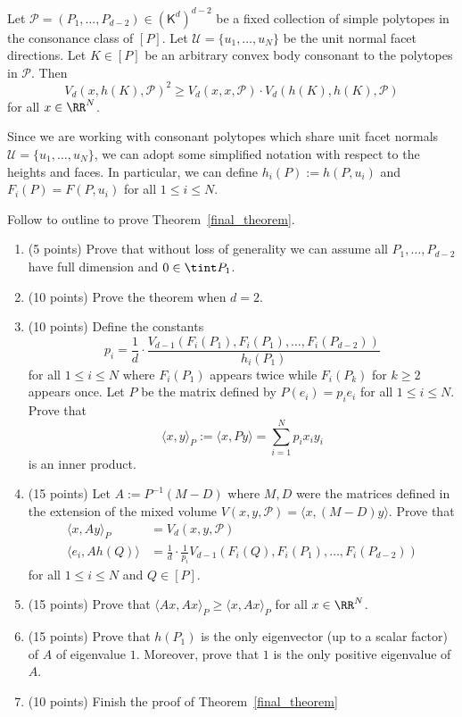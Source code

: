 \documentclass[11pt]{article}
\begin{document}
\begin{thm}\label{final_theorem}
    Let $\mathcal{P} = (P_1, \ldots, P_{d-2}) \in (\mathsf{K}^d)^{d-2}$ be a fixed collection of simple polytopes in the consonance class of $[P]$. Let $\mathcal{U} = \{u_1, \ldots, u_N\}$ be the unit normal facet directions. Let $K \in [P]$ be an arbitrary convex body consonant to the polytopes in $\mathcal{P}$. Then 
    \[
        V_{d}(x, h(K), \mathcal{P})^2 \geq V_{d}(x, x, \mathcal{P}) \cdot V_{d}(h(K), h(K), \mathcal{P})    
    \]
    for all $x \in \RR^N$. 
\end{thm}

Since we are working with consonant polytopes which share unit facet normals $\mathcal{U} = \{u_1, \ldots, u_N\}$, we can adopt some simplified notation with respect to the heights and faces. In particular, we can define $h_i(P) := h(P, u_i)$ and $F_i(P) = F(P, u_i)$ for all $1 \leq i \leq N$.

\begin{prob} [80 points]
    Follow to outline to prove Theorem~\ref{final_theorem}.
    \begin{enumerate}[label = (\alph*)]
        \item (5 points) Prove that without loss of generality we can assume all $P_1, \ldots, P_{d-2}$ have full dimension and $0 \in \tint P_1$.
        \item (10 points) Prove the theorem when $d = 2$. 
        \item (10 points) Define the constants 
        \[
            p_i = \frac{1}{d} \cdot \frac{V_{d-1}(F_i(P_1), F_i(P_1), \ldots, F_i(P_{d-2}))}{h_i(P_1)}
        \]
        for all $1 \leq i \leq N$ where $F_i(P_1)$ appears twice while $F_i(P_k)$ for $k \geq 2$ appears once. Let $P$ be the matrix defined by $P(e_i) = p_i e_i$ for all $1 \leq i \leq N$. Prove that 
        \[
            \langle x, y \rangle_P := \langle x, Py \rangle = \sum_{i = 1}^N p_i x_i y_i  
        \]
        is an inner product. 
        \item (15 points) Let $A := P^{-1}(M-D)$ where $M, D$ were the matrices defined in the extension of the mixed volume $V(x, y, \mathcal{P}) = \langle x, (M-D)y \rangle$. Prove that
        \begin{align*}
            \langle x, Ay \rangle_P & = V_d(x, y, \mathcal{P}) \\
            \langle e_i, A h(Q) \rangle & = \frac{1}{d} \cdot \frac{1}{p_i} V_{d-1}(F_i(Q), F_i(P_1), \ldots, F_i(P_{d-2}))
        \end{align*}
        for all $1 \leq i \leq N$ and $Q \in [P]$. 
        \item (15 points) Prove that $\langle Ax, Ax \rangle_P \geq \langle x, Ax \rangle_P$ for all $x \in \RR^N$. 
        \item (15 points) Prove that $h(P_1)$ is the only eigenvector (up to a scalar factor) of $A$ of eigenvalue $1$. Moreover, prove that $1$ is the only positive eigenvalue of $A$. 
        \item (10 points) Finish the proof of Theorem~\ref{final_theorem}
    \end{enumerate}
\end{prob}
\end{document}
